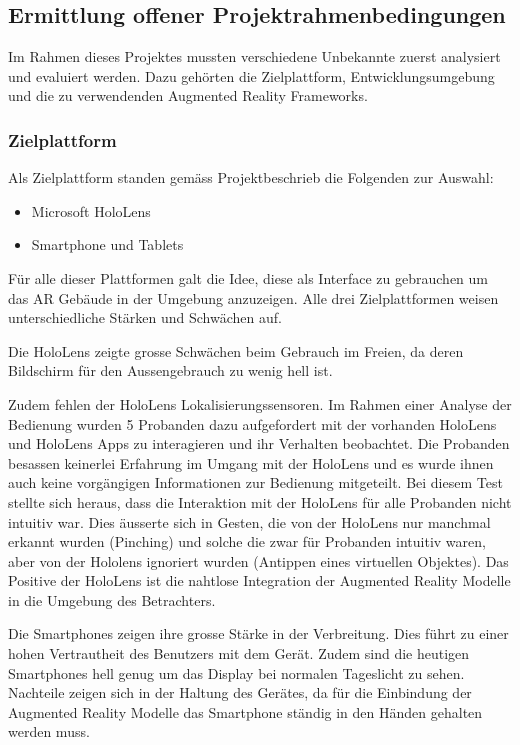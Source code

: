\documentclass[a4paper]{scrreprt}
\begin{document}
\subsection{Ermittlung offener Projektrahmenbedingungen}
\label{ch:evaluation}
Im Rahmen dieses Projektes mussten verschiedene Unbekannte zuerst analysiert und evaluiert werden. Dazu gehörten die Zielplattform, Entwicklungsumgebung und die zu verwendenden Augmented Reality Frameworks.
\subsubsection{Zielplattform}
Als Zielplattform standen gemäss Projektbeschrieb die Folgenden zur Auswahl:
\begin{itemize}
\item Microsoft HoloLens
\item Smartphone und Tablets
\end{itemize}
Für alle dieser Plattformen galt die Idee, diese als Interface zu gebrauchen um das AR Gebäude in der Umgebung anzuzeigen. Alle drei Zielplattformen weisen unterschiedliche Stärken und Schwächen auf.

Die HoloLens zeigte grosse Schwächen beim Gebrauch im Freien, da deren Bildschirm für den Aussengebrauch zu wenig hell ist.

Zudem fehlen der HoloLens Lokalisierungssensoren. Im Rahmen einer Analyse der Bedienung wurden 5 Probanden dazu aufgefordert mit der vorhanden HoloLens und HoloLens Apps zu interagieren und ihr Verhalten beobachtet. Die Probanden besassen keinerlei Erfahrung im Umgang mit der HoloLens und es wurde ihnen auch keine vorgängigen Informationen zur Bedienung mitgeteilt. Bei diesem Test stellte sich heraus, dass die Interaktion mit der HoloLens für alle Probanden nicht intuitiv war. Dies äusserte sich in Gesten, die von der HoloLens nur manchmal erkannt wurden (Pinching) und solche die zwar für Probanden intuitiv waren, aber von der Hololens ignoriert wurden (Antippen eines virtuellen Objektes).
Das Positive der HoloLens ist die nahtlose Integration der Augmented Reality Modelle in die Umgebung des Betrachters.

Die Smartphones zeigen ihre grosse Stärke in der Verbreitung. Dies führt zu einer hohen Vertrautheit des Benutzers mit dem Gerät. Zudem sind die heutigen Smartphones hell genug um das Display bei normalen Tageslicht zu sehen.
Nachteile zeigen sich in der Haltung des Gerätes, da für die Einbindung der Augmented Reality Modelle das Smartphone ständig in den Händen gehalten werden muss.
\end{document}
